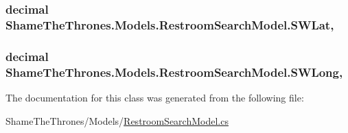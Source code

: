 \subsubsection[{\texorpdfstring{S\+W\+Lat}{SWLat}}]{\setlength{\rightskip}{0pt plus 5cm}decimal Shame\+The\+Thrones.\+Models.\+Restroom\+Search\+Model.\+S\+W\+Lat\hspace{0.3cm}{\ttfamily [get]}, {\ttfamily [set]}}\hypertarget{class_shame_the_thrones_1_1_models_1_1_restroom_search_model_ac0b754f91ba1bfaaf0f81eb7c418fc1e}{}\label{class_shame_the_thrones_1_1_models_1_1_restroom_search_model_ac0b754f91ba1bfaaf0f81eb7c418fc1e}
\subsubsection[{\texorpdfstring{S\+W\+Long}{SWLong}}]{\setlength{\rightskip}{0pt plus 5cm}decimal Shame\+The\+Thrones.\+Models.\+Restroom\+Search\+Model.\+S\+W\+Long\hspace{0.3cm}{\ttfamily [get]}, {\ttfamily [set]}}\hypertarget{class_shame_the_thrones_1_1_models_1_1_restroom_search_model_af351d2f096c0a768b319c03fdd09f4bd}{}\label{class_shame_the_thrones_1_1_models_1_1_restroom_search_model_af351d2f096c0a768b319c03fdd09f4bd}


The documentation for this class was generated from the following file\+:\begin{DoxyCompactItemize}
\item 
Shame\+The\+Thrones/\+Models/\hyperlink{_restroom_search_model_8cs}{Restroom\+Search\+Model.\+cs}\end{DoxyCompactItemize}
